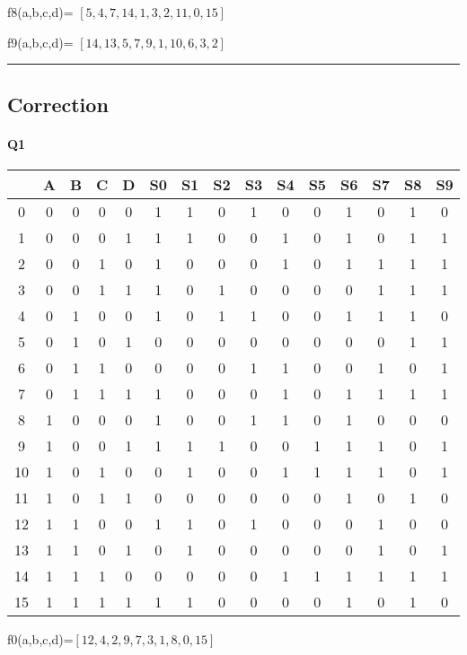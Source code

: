 f8(a,b,c,d)= $[5, 4, 7, 14, 1, 3, 2, 11, 0, 15]$

f9(a,b,c,d)= $[14, 13, 5, 7, 9, 1, 10, 6, 3, 2]$


\hrule width 1\linewidth\pagebreak
\subsection{Correction}

\paragraph{Q1}

        \begin{tabular}{|c|c|c|c|c||c|c|c|c|c|c|c|c|c|c|}
    \toprule
         & A & B & C & D & S0 & S1 & S2 & S3 & S4 & S5 & S6 & S7 & S8 & S9\\ \midrule0 & 0 & 0 & 0 & 0 & 1 & 1 & 0 & 1 & 0 & 0 & 1 & 0 & 1 & 0\\1 & 0 & 0 & 0 & 1 & 1 & 1 & 0 & 0 & 1 & 0 & 1 & 0 & 1 & 1\\2 & 0 & 0 & 1 & 0 & 1 & 0 & 0 & 0 & 1 & 0 & 1 & 1 & 1 & 1\\3 & 0 & 0 & 1 & 1 & 1 & 0 & 1 & 0 & 0 & 0 & 0 & 1 & 1 & 1\\\midrule4 & 0 & 1 & 0 & 0 & 1 & 0 & 1 & 1 & 0 & 0 & 1 & 1 & 1 & 0\\5 & 0 & 1 & 0 & 1 & 0 & 0 & 0 & 0 & 0 & 0 & 0 & 0 & 1 & 1\\6 & 0 & 1 & 1 & 0 & 0 & 0 & 0 & 1 & 1 & 0 & 0 & 1 & 0 & 1\\7 & 0 & 1 & 1 & 1 & 1 & 0 & 0 & 0 & 1 & 0 & 1 & 1 & 1 & 1\\\midrule8 & 1 & 0 & 0 & 0 & 1 & 0 & 0 & 1 & 1 & 0 & 1 & 0 & 0 & 0\\9 & 1 & 0 & 0 & 1 & 1 & 1 & 1 & 0 & 0 & 1 & 1 & 1 & 0 & 1\\10 & 1 & 0 & 1 & 0 & 0 & 1 & 0 & 0 & 1 & 1 & 1 & 1 & 0 & 1\\11 & 1 & 0 & 1 & 1 & 0 & 0 & 0 & 0 & 0 & 0 & 1 & 0 & 1 & 0\\\midrule12 & 1 & 1 & 0 & 0 & 1 & 1 & 0 & 1 & 0 & 0 & 0 & 1 & 0 & 0\\13 & 1 & 1 & 0 & 1 & 0 & 1 & 0 & 0 & 0 & 0 & 0 & 1 & 0 & 1\\14 & 1 & 1 & 1 & 0 & 0 & 0 & 0 & 0 & 1 & 1 & 1 & 1 & 1 & 1\\15 & 1 & 1 & 1 & 1 & 1 & 1 & 0 & 0 & 0 & 0 & 1 & 0 & 1 & 0\\\bottomrule
        \end{tabular}
        f0(a,b,c,d)=$[12, 4, 2, 9, 7, 3, 1, 8, 0, 15]$

